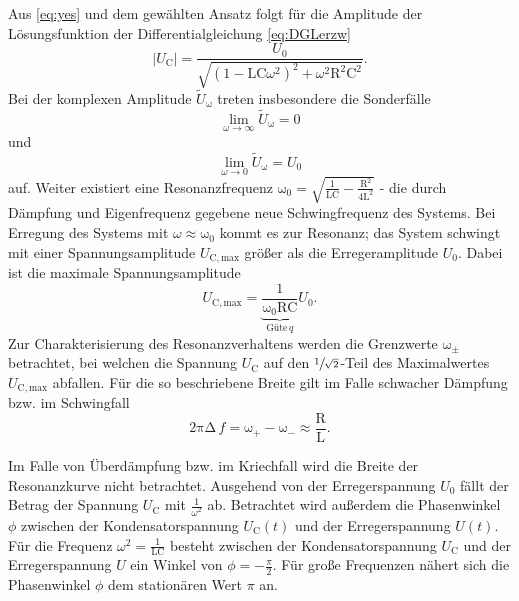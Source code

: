 Aus \eqref{eq:yes} und dem gewählten Ansatz folgt für die Amplitude der Lösungsfunktion der Differentialgleichung \eqref{eq:DGLerzw}
\begin{equation}
	|U_\mathup{C}| = \frac{U_0}{\sqrt{(1 − \mathup{LC}\omega^2)^2 +ω^2\mathup{R^2C^2}}}. 
\end{equation}
Bei der komplexen Amplitude $\tilde{U}_\mathup{\omega}$ treten insbesondere die Sonderfälle
\begin{equation}
 	\lim_{\omega\to\infty} \tilde{U}_\mathup{\omega} =0
\end{equation}
und
\begin{equation}
 \lim_{\omega\to 0}\tilde{U}_\mathup{\omega} = U_0
\end{equation} 
 auf.
Weiter existiert eine Resonanzfrequenz $\mathup{\omega_0} = \sqrt{\frac{1}{\mathup{LC}}-\frac{\mathup{R^2}}{4\mathup{L^2}}}$ - die durch Dämpfung und Eigenfrequenz gegebene neue Schwingfrequenz des Systems.
Bei Erregung des Systems mit $\omega \approx \mathup{\omega_0}$ kommt es zur Resonanz; das System schwingt mit einer Spannungsamplitude $U_\mathup{C,max}$ größer als die Erregeramplitude $U_0$.
Dabei ist die maximale Spannungsamplitude
\begin{equation}
	U_\mathup{C,max}= \underbrace{\frac{1}{\mathup{\omega_0RC}}}_{\text{Güte}\, q} U_0. 
	\label{eq:maxspannung}
\end{equation}
Zur Charakterisierung des Resonanzverhaltens werden die Grenzwerte $\mathup{\omega_\pm}$ betrachtet, bei welchen die Spannung $U_\mathup{C}$ auf den $\sfrac{1}{\sqrt{2}}$-Teil des Maximalwertes $U_\mathup{C,max}$ abfallen.  
Für die so beschriebene Breite gilt im Falle schwacher Dämpfung bzw. im Schwingfall
\begin{equation}
	\mathup{2\pi\Delta}\, f = \mathup{ω_+} − \mathup{ω_−} \approx \frac{\mathup{R}}{\mathup{L}}.
	\label{eq:deltaf}
\end{equation}

Im Falle von Überdämpfung bzw. im Kriechfall wird die Breite der Resonanzkurve nicht betrachtet. Ausgehend von der  Erregerspannung $U_0$ fällt der Betrag der Spannung $U_\mathup{C}$  mit $\frac{1}{\omega^2}$ ab.
Betrachtet wird außerdem die Phasenwinkel $\phi$ zwischen der Kondensatorspannung $U_\mathup{C}(t)$ und der Erregerspannung $U(t)$.\\
Für die Frequenz $\omega^2 = \frac{1}{\mathup{LC}}$ besteht zwischen der Kondensatorspannung $U_\mathup{C}$ und der Erregerspannung $U$ ein Winkel von $\phi =-\frac{\pi}{2}$.
Für große Frequenzen nähert sich die Phasenwinkel $\phi$ dem stationären Wert $\pi$ an.


